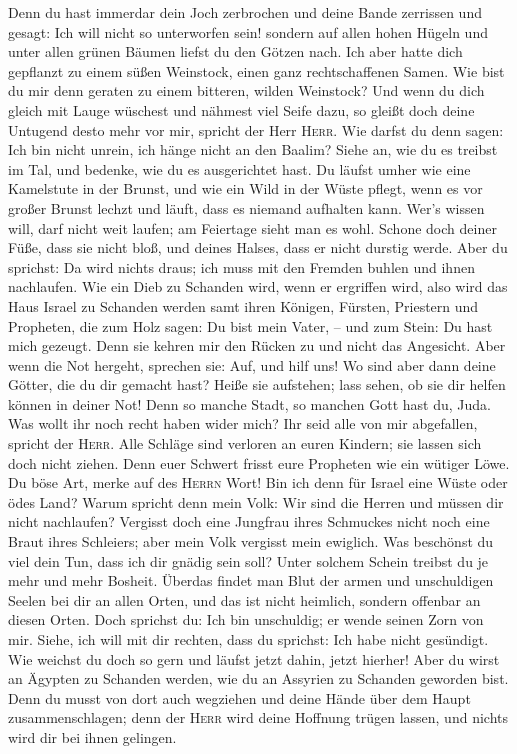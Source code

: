 Denn du hast immerdar dein Joch zerbrochen und deine Bande zerrissen und
gesagt: Ich will nicht so unterworfen sein! sondern auf allen hohen
Hügeln und unter allen grünen Bäumen liefst du den Götzen nach.
 Ich aber hatte dich gepflanzt zu einem süßen Weinstock,
einen ganz rechtschaffenen Samen. Wie bist du mir denn geraten zu einem
bitteren, wilden Weinstock?  Und wenn du dich gleich mit
Lauge wüschest und nähmest viel Seife dazu, so gleißt doch deine
Untugend desto mehr vor mir, spricht der Herr \textsc{Herr}.
 Wie darfst du denn sagen: Ich bin nicht unrein, ich
hänge nicht an den Baalim? Siehe an, wie du es treibst im Tal, und
bedenke, wie du es ausgerichtet hast.  Du läufst umher
wie eine Kamelstute in der Brunst, und wie ein Wild in der Wüste pflegt,
wenn es vor großer Brunst lechzt und läuft, dass es niemand aufhalten
kann. Wer's wissen will, darf nicht weit laufen; am Feiertage sieht man
es wohl.  Schone doch deiner Füße, dass sie nicht bloß,
und deines Halses, dass er nicht durstig werde. Aber du sprichst: Da
wird nichts draus; ich muss mit den Fremden buhlen und ihnen nachlaufen.
 Wie ein Dieb zu Schanden wird, wenn er ergriffen wird,
also wird das Haus Israel zu Schanden werden samt ihren Königen,
Fürsten, Priestern und Propheten,  die zum Holz sagen: Du
bist mein Vater, -- und zum Stein: Du hast mich gezeugt. Denn sie kehren
mir den Rücken zu und nicht das Angesicht. Aber wenn die Not hergeht,
sprechen sie: Auf, und hilf uns!  Wo sind aber dann deine
Götter, die du dir gemacht hast? Heiße sie aufstehen; lass sehen, ob sie
dir helfen können in deiner Not! Denn so manche Stadt, so manchen Gott
hast du, Juda.  Was wollt ihr noch recht haben wider
mich? Ihr seid alle von mir abgefallen, spricht der \textsc{Herr}.
 Alle Schläge sind verloren an euren Kindern; sie lassen
sich doch nicht ziehen. Denn euer Schwert frisst eure Propheten wie ein
wütiger Löwe.  Du böse Art, merke auf des \textsc{Herrn}
Wort! Bin ich denn für Israel eine Wüste oder ödes Land? Warum spricht
denn mein Volk: Wir sind die Herren und müssen dir nicht nachlaufen?
 Vergisst doch eine Jungfrau ihres Schmuckes nicht noch
eine Braut ihres Schleiers; aber mein Volk vergisst mein ewiglich.
 Was beschönst du viel dein Tun, dass ich dir gnädig sein
soll? Unter solchem Schein treibst du je mehr und mehr Bosheit.
 Überdas findet man Blut der armen und unschuldigen
Seelen bei dir an allen Orten, und das ist nicht heimlich, sondern
offenbar an diesen Orten.  Doch sprichst du: Ich bin
unschuldig; er wende seinen Zorn von mir. Siehe, ich will mit dir
rechten, dass du sprichst: Ich habe nicht gesündigt.  Wie
weichst du doch so gern und läufst jetzt dahin, jetzt hierher! Aber du
wirst an Ägypten zu Schanden werden, wie du an Assyrien zu Schanden
geworden bist.  Denn du musst von dort auch wegziehen und
deine Hände über dem Haupt zusammenschlagen; denn der \textsc{Herr} wird
deine Hoffnung trügen lassen, und nichts wird dir bei ihnen gelingen.

